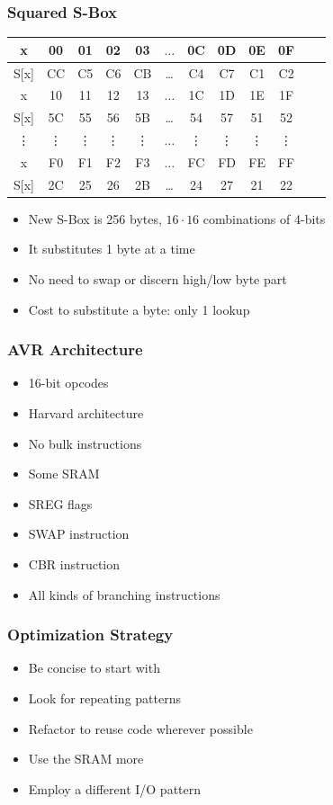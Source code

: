 \documentclass{beamer}
\begin{document}
\begin{frame}
\frametitle{Squared S-Box}
\begin{tabular}{| c | c  | c | c | c  | c  | c | c | c  | c | c | c |}
\hline
  x & 00 & 01 & 02 & 03  &  $\dots$  & 0C & 0D & 0E & 0F   \\
\hline
 S[x] & CC & C5 & C6 & CB & \dots & C4 & C7 & C1 & C2   \\
\hline
  x & 10 & 11 & 12 & 13  &  $\dots$  & 1C & 1D & 1E & 1F   \\
\hline
 S[x] & 5C & 55 & 56 & 5B & \dots & 54 & 57 & 51 & 52   \\
\hline
  \vdots & \vdots & \vdots & \vdots & \vdots  &  $\dots$  & \vdots &\vdots & \vdots & \vdots   \\
\hline
  x & F0 & F1 & F2 & F3  &  $\dots$  & FC & FD & FE & FF   \\
\hline
 S[x] & 2C & 25 & 26 & 2B & \dots & 24 & 27 & 21 & 22   \\
\hline
\end{tabular}

\begin{itemize}
\item New S-Box is 256 bytes, $16\cdot16$ combinations of 4-bits
\item It substitutes 1 byte at a time
\item No need to swap or discern high/low byte part
\item Cost to substitute a byte: only 1 lookup
\end{itemize}
\end{frame}

\begin{frame}
\frametitle{AVR Architecture}
        \begin{itemize}
        \item 16-bit opcodes
        \item Harvard architecture
        \item No bulk instructions
        \item Some SRAM
        \item SREG flags
        \item SWAP instruction
        \item CBR instruction
        \item All kinds of branching instructions
        \end{itemize}
\end{frame}

\begin{frame}
\frametitle{Optimization Strategy}
        \begin{itemize}
        \item Be concise to start with
        \item Look for repeating patterns
        \item Refactor to reuse code wherever possible
        \item Use the SRAM more
        \item Employ a different I/O pattern
        \end{itemize}
\end{frame}
\end{document}

